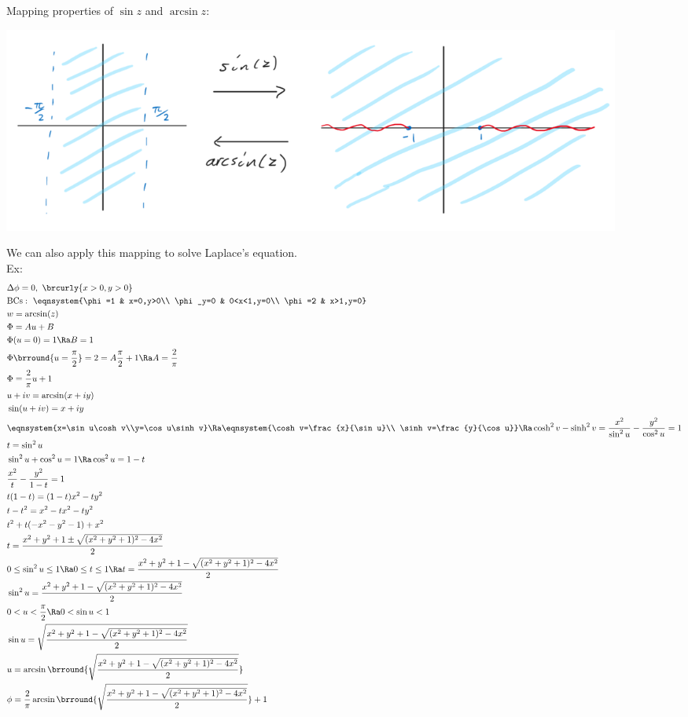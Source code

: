 Mapping properties of $\sin z$ and $\arcsin z$:\\
\centerline{\includegraphics[width=0.9\textwidth]{Images/ComplexAnalysisPictures/SineInverse.png}}
We can also apply this mapping to solve Laplace's equation.\\
Ex:
\begin{align*}
    &\Delta \phi=0,\ \brcurly{x>0,y>0}\\
    &\mathrm{BCs}:\ \eqnsystem{\phi=1 & x=0,y>0\\ \phi_y=0 & 0<x<1,y=0\\ \phi=2 & x>1,y=0}\\
    &w=\arcsin(z)\\
    &\Phi=Au+B\\
    &\Phi(u=0)=1\Ra B=1\\
    &\Phi\brround{u=\frac{\pi}{2}}=2=A\frac{\pi}{2}+1\Ra A=\frac{2}{\pi}\\
    &\Phi=\frac{2}{\pi}u+1\\
    &u+iv=\arcsin(x+iy)\\
    &\sin(u+iv)=x+iy\\
    &\eqnsystem{x=\sin u\cosh v\\y=\cos u\sinh v}\Ra\eqnsystem{\cosh v=\frac{x}{\sin u}\\ \sinh v=\frac{y}{\cos u}}\Ra \cosh^2v-\sinh^2v=\frac{x^2}{\sin^2u}-\frac{y^2}{\cos^2u}=1\\
    &t=\sin^2u\\
    &\sin^2u+\cos^2u=1\Ra \cos^2u=1-t\\
    &\frac{x^2}{t}-\frac{y^2}{1-t}=1\\
    &t(1-t)=(1-t)x^2-ty^2\\
    &t-t^2=x^2-tx^2-ty^2\\
    &t^2+t(-x^2-y^2-1)+x^2\\
    &t=\frac{x^2+y^2+1\pm\sqrt{(x^2+y^2+1)^2-4x^2}}{2}\\
    &0\leq\sin^2 u\leq1\Ra 0\leq t\leq1\Ra t=\frac{x^2+y^2+1-\sqrt{(x^2+y^2+1)^2-4x^2}}{2}\\
    &\sin^2 u=\frac{x^2+y^2+1-\sqrt{(x^2+y^2+1)^2-4x^2}}{2}\\
    &0<u<\frac{\pi}{2}\Ra 0<\sin u<1\\
    &\sin u=\sqrt{\frac{x^2+y^2+1-\sqrt{(x^2+y^2+1)^2-4x^2}}{2}}\\
    &u=\arcsin\brround{\sqrt{\frac{x^2+y^2+1-\sqrt{(x^2+y^2+1)^2-4x^2}}{2}}}\\
    &\phi=\frac{2}{\pi}\arcsin\brround{\sqrt{\frac{x^2+y^2+1-\sqrt{(x^2+y^2+1)^2-4x^2}}{2}}}+1
\end{align*}
